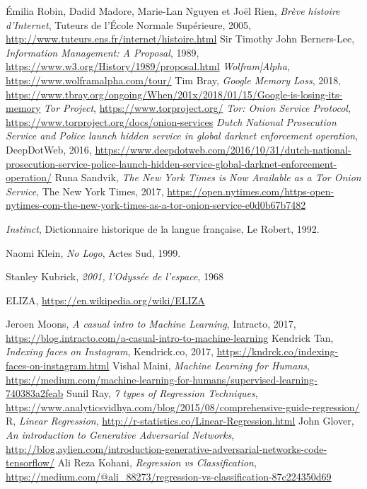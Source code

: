 \begin{thebibliography}{99}
     Émilia Robin, Dadid Madore, Marie-Lan Nguyen et Joël Rien, \emph{Brève histoire d'Internet}, Tuteurs de l'École Normale Supérieure, 2005, \url{http://www.tuteurs.ens.fr/internet/histoire.html}
     Sir Timothy John Berners-Lee, \emph{Information Management: A Proposal}, 1989, \url{https://www.w3.org/History/1989/proposal.html}
     \emph{Wolfram|Alpha}, \url{https://www.wolframalpha.com/tour/}
     Tim Bray, \emph{Google Memory Loss}, 2018, \url{https://www.tbray.org/ongoing/When/201x/2018/01/15/Google-is-losing-its-memory}
     \emph{Tor Project}, \url{https://www.torproject.org/}
     \emph{Tor: Onion Service Protocol}, \url{https://www.torproject.org/docs/onion-services}
     \emph{Dutch National Prosecution Service and Police launch hidden service in global darknet enforcement operation}, DeepDotWeb, 2016, \url{https://www.deepdotweb.com/2016/10/31/dutch-national-prosecution-service-police-launch-hidden-service-global-darknet-enforcement-operation/}
     Runa Sandvik, \emph{The New York Times is Now Available as a Tor Onion Service}, The New York Times, 2017, \url{https://open.nytimes.com/https-open-nytimes-com-the-new-york-times-as-a-tor-onion-service-e0d0b67b7482}
    
     \emph{Instinct}, Dictionnaire historique de la langue française, Le Robert, 1992. 

     Naomi Klein, \emph{No Logo}, Actes Sud, 1999.

     Stanley Kubrick, \emph{2001, l'Odyssée de l'espace}, 1968

     ELIZA, \url{https://en.wikipedia.org/wiki/ELIZA}

     Jeroen Moons, \emph{A casual intro to Machine Learning}, Intracto, 2017, \url{https://blog.intracto.com/a-casual-intro-to-machine-learning}
     Kendrick Tan, \emph{Indexing faces on Instagram}, Kendrick.co, 2017, \url{https://kndrck.co/indexing-faces-on-instagram.html}
     Vishal Maini, \emph{Machine Learning for Humans}, \url{https://medium.com/machine-learning-for-humans/supervised-learning-740383a2feab}
     Sunil Ray, \emph{7 types of Regression Techniques}, \url{https://www.analyticsvidhya.com/blog/2015/08/comprehensive-guide-regression/}
     R, \emph{Linear Regression}, \url{http://r-statistics.co/Linear-Regression.html}
     John Glover, \emph{An introduction to Generative Adversarial Networks}, \url{http://blog.aylien.com/introduction-generative-adversarial-networks-code-tensorflow/}
     Ali Reza Kohani, \emph{Regression vs Classification}, \url{https://medium.com/@ali_88273/regression-vs-classification-87c224350d69}


\end{thebibliography}
